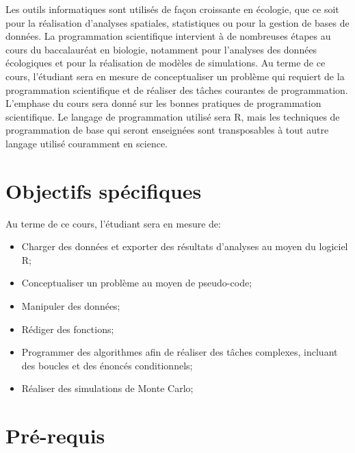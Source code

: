 \documentclass[12]{article}
\begin{document}
	Les outils informatiques sont utilisés de façon croissante en écologie,
	que ce soit pour la réalisation d'analyses spatiales, statistiques ou pour
	la gestion de bases de données. La programmation scientifique intervient à
	de nombreuses étapes au cours du baccalauréat en biologie, notamment pour
	l'analyses des données écologiques et pour la réalisation de modèles
	de simulations. Au terme de ce cours, l'étudiant sera en mesure de
	conceptualiser un problème qui requiert de la programmation scientifique
	et de réaliser des tâches courantes de programmation. L'emphase du cours
	sera donné sur les bonnes pratiques de programmation scientifique. Le
	langage de programmation utilisé sera R, mais les techniques de
	programmation de base qui seront enseignées sont transposables à tout
	autre langage utilisé couramment en science.

    \newpage
    
	\section*{Objectifs spécifiques}

	Au terme de ce cours, l'étudiant sera en mesure de:

	\begin{itemize}
	\renewcommand{\labelitemi}{$\bullet$}

	\item Charger des données et exporter des résultats d'analyses au moyen du
	logiciel R;

	\item Conceptualiser un problème au moyen de pseudo-code;

	\item Manipuler des données;

	\item Rédiger des fonctions;

    \item Programmer des algorithmes afin de réaliser des tâches complexes,
	incluant des boucles et des énoncés conditionnels;

	\item Réaliser des simulations de Monte Carlo;

	\end{itemize}

	\section*{Pré-requis}
\end{document}
